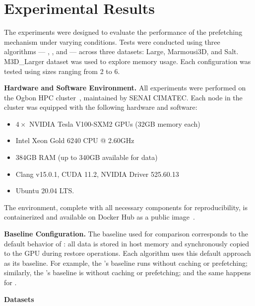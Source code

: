 \documentclass[Ingles]{ic-tese-v3}
\begin{document}
\section{Experimental Results}
\label{sec:prefetch_result}

The experiments were designed to evaluate the performance of the prefetching mechanism under varying conditions. Tests were conducted using three \checkpointing algorithms — \revolve, \zcut, and \uniform — across three datasets: Large, Marmousi3D, and Salt. M3D\_Larger dataset was used to explore memory usage. Each configuration was tested using \cache sizes ranging from 2 to 6.

\vspace{1em}
\noindent
\textbf{Hardware and Software Environment.}
All experiments were performed on the Ogbon HPC cluster~\cite{ogbon}, maintained by SENAI CIMATEC. Each node in the cluster was equipped with the following hardware and software:

\begin{itemize}
    \item $4 \times$ NVIDIA Tesla V100-SXM2 GPUs (32GB memory each)
    \item Intel Xeon Gold 6240 CPU @ 2.60GHz
    \item 384GB RAM (up to 340GB available for \checkpointing data)
    \item Clang v15.0.1, CUDA 11.2, NVIDIA Driver 525.60.13
    \item Ubuntu 20.04 LTS.
\end{itemize}

The environment, complete with all necessary components for reproducibility, is containerized and available on Docker Hub as a public image~\cite{dockerhub}.

\vspace{1em}
\noindent
\textbf{Baseline Configuration.}
The baseline used for comparison corresponds to the default behavior of \awave: all \checkpointing data is stored in host memory and synchronously copied to the GPU during restore operations. Each \checkpointing algorithm uses this default approach as its baseline. For example, the \revolve's baseline runs \revolve without caching or prefetching; similarly, the \zcut's baseline is \zcut without caching or prefetching; and the same happens for \uniform.

\vspace{1em}
\noindent
\textbf{Datasets}
\end{document}
